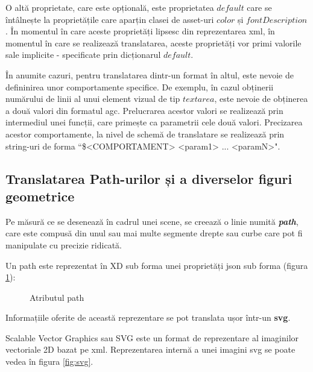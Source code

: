  O altă proprietate, care este opțională, este proprietatea $default$ care se întâlnește la proprietățile care aparțin clasei de asset-uri $color$ și $fontDescription$. În momentul în care aceste proprietăți lipsesc din reprezentarea xml, în momentul în care se realizează translatarea, aceste proprietăți vor primi valorile sale implicite - specificate prin dicționarul $default$.

 În anumite cazuri, pentru translatarea dintr-un format în altul, este nevoie de defininirea unor comportamente specifice. De exemplu, în cazul obținerii numărului de linii al unui element vizual de tip $text area$, este nevoie de obținerea a două valori din formatul agc. Prelucrarea acestor valori se realizează prin intermediul unei funcții, care primește ca parametrii cele două valori. 
 Precizarea acestor comportamente, la nivel de schemă de translatare se realizează prin string-uri de forma ``\$<COMPORTAMENT> <param1> ... <paramN>".

\subsection{Translatarea Path-urilor și a diverselor figuri geometrice}

Pe măsură ce se desenează în cadrul unei scene, se creează o linie numită \textbf{\textit{path}}, care este compusă din unul sau mai multe segmente drepte sau curbe care pot fi manipulate cu precizie ridicată.

Un path este reprezentat în XD sub forma unei proprietăți json sub forma (figura \ref{fig:path}):

\begin{figure}[!htbp]
\caption{Atributul path}\label{fig:path}
\end{figure}

Informațiile oferite de această reprezentare se pot translata ușor într-un \textbf{svg}. 

Scalable Vector Graphics sau SVG este un format de reprezentare al imaginilor vectoriale 2D bazat pe xml. Reprezentarea internă a unei imagini svg se poate vedea în figura \ref{fig:svg}.

